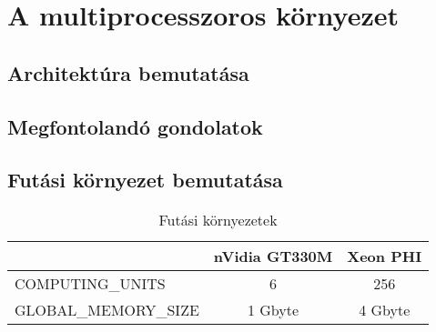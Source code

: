 \chapter{A multiprocesszoros környezet}

\section{Architektúra bemutatása}


\section{Megfontolandó gondolatok}


\section{Futási környezet bemutatása}

\begin{table}[ht]
	\footnotesize
	\centering
	\caption{Futási környezetek} \label{tab:envs}
	\begin{tabular}{ l | c | c }
	 & nVidia GT330M & Xeon PHI \\ \hline
	COMPUTING\_UNITS & 6 & 256\\
	GLOBAL\_MEMORY\_SIZE & 1 Gbyte & 4 Gbyte
	\end{tabular}
	\label{tab:TabularExample}
\end{table}

